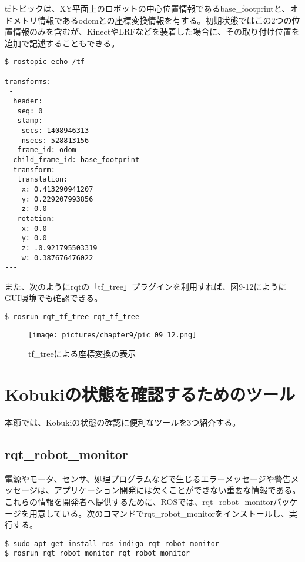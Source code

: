 tfトピックは、XY平面上のロボットの中心位置情報であるbase\_footprintと、オドメトリ情報であるodomとの座標変換情報を有する。初期状態ではこの2つの位置情報のみを含むが、KinectやLRFなどを装着した場合に、その取り付け位置を追加で記述することもできる。

\begin{lstlisting}[language=ROS]
$ rostopic echo /tf
---
transforms:
 -
  header:
   seq: 0
   stamp:
    secs: 1408946313
    nsecs: 528813156
   frame_id: odom
  child_frame_id: base_footprint
  transform:
   translation:
    x: 0.413290941207
    y: 0.229207993856
    z: 0.0
   rotation:
    x: 0.0
    y: 0.0
    z: .0.921795503319
    w: 0.387676476022
---
\end{lstlisting}

また、次のようにrqtの「tf\_tree」プラグインを利用すれば、図9-12にようにGUI環境でも確認できる。

\begin{lstlisting}[language=ROS]
$ rosrun rqt_tf_tree rqt_tf_tree
\end{lstlisting}

\begin{figure}[htp]
  \centering
  \texttt{[image: pictures/chapter9/pic\_09\_12.png]}
  \caption{tf\_treeによる座標変換の表示}
\end{figure}


\section{Kobukiの状態を確認するためのツール}

本節では、Kobukiの状態の確認に便利なツールを3つ紹介する。

\subsection{rqt\_robot\_monitor}

電源やモータ、センサ、処理プログラムなどで生じるエラーメッセージや警告メッセージは、アプリケーション開発には欠くことができない重要な情報である。これらの情報を開発者へ提供するために、ROSでは、rqt\_robot\_monitorパッケージを用意している。次のコマンドでrqt\_robot\_monitorをインストールし、実行する。

\begin{lstlisting}[language=ROS]
$ sudo apt-get install ros-indigo-rqt-robot-monitor
$ rosrun rqt_robot_monitor rqt_robot_monitor
\end{lstlisting}

